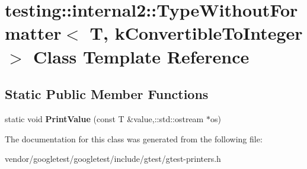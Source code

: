 \hypertarget{classtesting_1_1internal2_1_1TypeWithoutFormatter_3_01T_00_01kConvertibleToInteger_01_4}{}\section{testing\+:\+:internal2\+:\+:Type\+Without\+Formatter$<$ T, k\+Convertible\+To\+Integer $>$ Class Template Reference}
\label{classtesting_1_1internal2_1_1TypeWithoutFormatter_3_01T_00_01kConvertibleToInteger_01_4}
\subsection*{Static Public Member Functions}
\begin{DoxyCompactItemize}
\item 
static void {\bfseries Print\+Value} (const T \&value,\+::std\+::ostream $\ast$os)\hypertarget{classtesting_1_1internal2_1_1TypeWithoutFormatter_3_01T_00_01kConvertibleToInteger_01_4_a6b293e13b58e50bba0e220c25e0614b7}{}\label{classtesting_1_1internal2_1_1TypeWithoutFormatter_3_01T_00_01kConvertibleToInteger_01_4_a6b293e13b58e50bba0e220c25e0614b7}

\end{DoxyCompactItemize}


The documentation for this class was generated from the following file\+:\begin{DoxyCompactItemize}
\item 
vendor/googletest/googletest/include/gtest/gtest-\/printers.\+h\end{DoxyCompactItemize}
